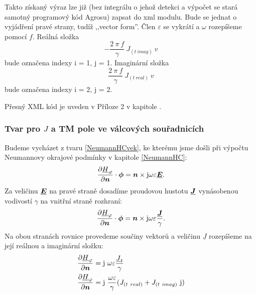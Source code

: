 \documentclass[12pt,a4paper,oneside]{article}
\numberwithin{equation}{section} %
\numberwithin{figure}{section} %
\numberwithin{table}{section} %
\newcommand{\mj}{\mathrm{j}} %
\renewcommand{\vec}[1]{\mbox{\boldmath$#1$}} %
\newcommand{\faz}[1]{{\underline{#1}}} %
\begin{document}
Takto získaný výraz lze již (bez integrálu o jehož detekci a výpočet se stará samotný programový kód Agrosu) zapsat do xml modulu. Bude se jednat o vyjádření pravé strany, tudíž ,,vector form''. Člen $\varepsilon$ se vykrátí a $\omega$ rozepíšeme pomocí $f$. Reálná složka  
\begin{equation}
- \frac{2 ~ \pi ~ f}{\gamma} ~ J_{(t~imag)} ~ v
\end{equation} 
bude označena indexy i = 1, j = 1. Imaginární složka 
\begin{equation}
\frac{2 ~ \pi ~ f}{\gamma} ~ J_{(t~real)} ~ v
\end{equation}
bude označena indexy i = 2, j = 2.

Přesný XML kód je uveden v Příloze 2 v kapitole .


\subsubsection*{Tvar pro \faz{\vec{J}} a TM pole ve válcových souřadnicích}
Budeme vycházet z tvaru \ref{NeumannHCvek}, ke kterému jsme došli při výpočtu Neumannovy okrajové podmínky v kapitole \ref{NeumannHC}:
\begin{equation}
\frac{\partial \faz{H}_{\varphi}}{\partial \vec{n}} \cdot \vec{\phi} = \vec{n} \times \mj \omega \varepsilon \faz{\vec{E}} .
\end{equation}
Za veličinu $\faz{\vec{E}}$ na pravé straně dosadíme proudovou hustotu $\faz{\vec{J}}$ vynásobenou vodivostí $\gamma$ na vnitřní straně rozhraní:
\begin{equation}
\frac{\partial \faz{H}_{\varphi}}{\partial \vec{n}} \cdot \vec{\phi} = \vec{n} \times \mj \omega \varepsilon \frac{\faz{\vec{J}}}{\gamma}.
\end{equation}
Na obou stranách rovnice provedeme součiny vektorů a veličinu $\faz{J}$ rozepíšeme na její reálnou a imaginární složku:
\begin{subequations}
\begin{align}
\frac{\partial \faz{H} _{\varphi}}{\partial \vec{n}} &= \mj ~ \omega \varepsilon \frac{\faz{J} _t}{\gamma}
\\
\frac{\partial \faz{H} _{\varphi}}{\partial \vec{n}} &= \mj ~ \frac{\omega \varepsilon}{\gamma} (J _{(t~real)} + J _{(t~imag)} ~ \mj)
\end{align}
\end{subequations}
\end{document}
